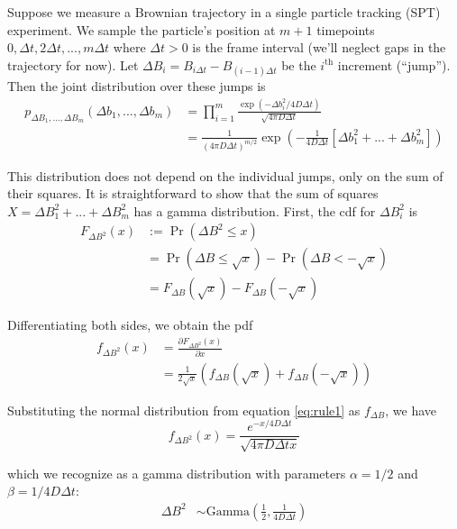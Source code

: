 \documentclass{article}
\begin{document}
Suppose we measure a Brownian trajectory in a single particle tracking (SPT) experiment.
We sample the particle's position at $m+1$ timepoints
$0, \Delta t, 2 \Delta t, ..., m \Delta t$ where $\Delta t > 0$ is the
frame interval (we'll neglect gaps in the trajectory for now).
Let $\Delta B_{i} = B_{i \Delta t} - B_{(i-1) \Delta t}$ be the
$i^{\text{th}}$ increment (``jump''). Then the joint distribution over
these jumps is
\begin{align*}
    p_{\Delta B_{1}, ..., \Delta B_{m}} \left( \Delta b_{1}, ..., \Delta b_{m} \right) &= \prod\limits_{i=1}^{m} \frac{ \exp \left( - \Delta b_{i}^{2} / 4 D \Delta t \right) }{ \sqrt{ 4 \pi D \Delta t } } \\
    &= \frac{1}{\left( 4 \pi D \Delta t \right)^{m/2}} \exp \left( - \frac{1}{4 D \Delta t} \left[ \Delta b_{1}^{2} + ... + \Delta b_{m}^{2} \right] \right)
\end{align*}

This distribution does not depend on the individual jumps,
only on the sum of their squares. It is straightforward to
show that the sum of squares $X = \Delta B_{1}^{2} + ... + \Delta B_{m}^{2}$
has a gamma distribution. First, the cdf for $\Delta B_{i}^{2}$ is
\begin{align*}
    F_{\Delta B^{2}} \left( x \right) &:= \Pr \left( \Delta B^{2} \leq x \right) \\
    &= \Pr \left( \Delta B \leq \sqrt{x} \right) - \Pr \left( \Delta B < -\sqrt{x} \right) \\
    &= F_{\Delta B} \left( \sqrt{x} \right) - F_{\Delta B} \left( - \sqrt{x} \right)
\end{align*}

Differentiating both sides, we obtain the pdf
\begin{align*}
    f_{\Delta B^{2}}(x) &= \frac{\partial F_{\Delta B^{2}}(x)}{\partial x} \\
    &= \frac{1}{2 \sqrt{x}} \left(
        f_{\Delta B} \left( \sqrt{x} \right) + f_{\Delta B} \left( - \sqrt{x} \right)
    \right)
\end{align*}

Substituting the normal distribution from equation \ref{eq:rule1} as $f_{\Delta B}$,
we have
\[
    f_{\Delta B^{2}}(x) = \frac{ e^{-x / 4 D \Delta t} }{ \sqrt{4 \pi D \Delta t x} }
\]

which we recognize as a gamma distribution with parameters $\alpha = 1/2$ and
$\beta = 1 / 4 D \Delta t$:
\begin{align*}
    \Delta B^{2} &\sim \text{Gamma} \left( \frac{1}{2}, \frac{1}{4 D \Delta t} \right)
\end{align*}
\end{document}

